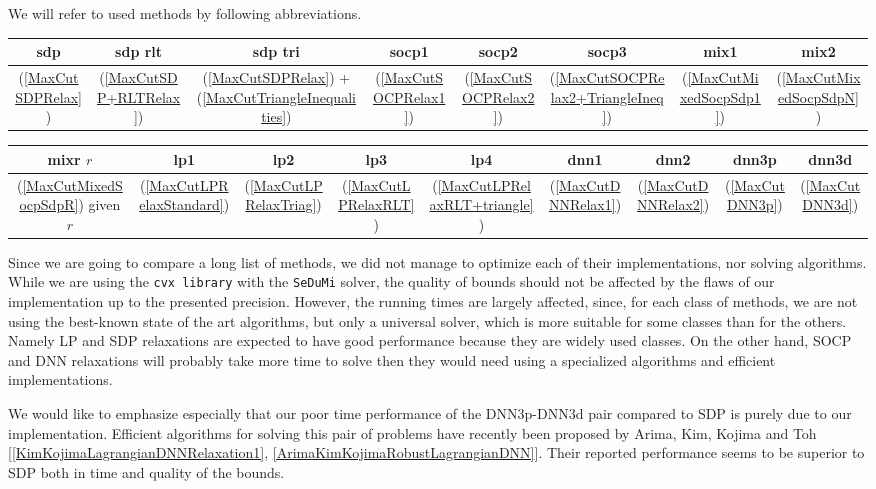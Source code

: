 \documentclass[12pt]{book}
\theoremstyle{definition}
\begin{document}
We will refer to used methods by following abbreviations.
\bigskip

\begin{tabular}{|c|c|c|c|c|c|c|c|}
\hline
sdp & 
sdp rlt &	
sdp tri &	
socp1 & 
socp2 &
socp3 &	
mix1 & 
mix2 
\\ \hline
(\ref{MaxCutSDPRelax}) & 
(\ref{MaxCutSDP+RLTRelax}) & 
(\ref{MaxCutSDPRelax}) + (\ref{MaxCutTriangleInequalities}) & (\ref{MaxCutSOCPRelax1}) & 
(\ref{MaxCutSOCPRelax2}) & 
(\ref{MaxCutSOCPRelax2+TriangleIneq}) &
(\ref{MaxCutMixedSocpSdp1}) &
(\ref{MaxCutMixedSocpSdpN}) \\
\hline
\end{tabular}

\begin{tabular}{|c|c|c|c|c|c|c|c|c|}
\hline
mixr $r$ &
lp1 &
lp2 &
lp3 &
lp4 &
dnn1 &
dnn2 &
dnn3p &
dnn3d 	
\\ \hline
(\ref{MaxCutMixedSocpSdpR}) given $r$ &
(\ref{MaxCutLPRelaxStandard}) &
(\ref{MaxCutLPRelaxTriag}) &
(\ref{MaxCutLPRelaxRLT}) &
(\ref{MaxCutLPRelaxRLT+triangle}) &
(\ref{MaxCutDNNRelax1}) &
(\ref{MaxCutDNNRelax2}) &
(\ref{MaxCutDNN3p}) &
(\ref{MaxCutDNN3d}) \\
\hline
\end{tabular}

\bigskip


Since we are going to compare a long list of methods, we did not manage to optimize each of their implementations, nor solving algorithms. While we are using the {\tt cvx library} with the {\tt SeDuMi} solver, the quality of bounds should not be affected by the flaws of our implementation up to the presented precision. However, the running times are largely affected, since, for each class of methods, we are not using the best-known state of the art algorithms, but only a universal solver, which is more suitable for some classes than for the others. Namely LP and SDP relaxations are expected to have good performance because they are widely used classes. On the other hand, SOCP and DNN relaxations will probably take more time to solve then they would need using a specialized algorithms and efficient implementations.

\rem We would like to emphasize especially that our poor time performance of the DNN3p-DNN3d pair compared to SDP is purely due to our implementation. Efficient algorithms for solving this pair of problems have recently been proposed by Arima, Kim, Kojima and Toh [\ref{KimKojimaLagrangianDNNRelaxation1}, \ref{ArimaKimKojimaRobustLagrangianDNN}]. Their reported performance seems to be superior to SDP both in time and quality of the bounds.
\end{document}
